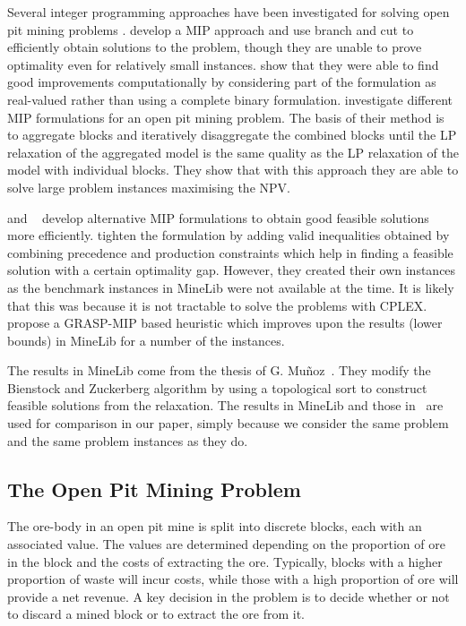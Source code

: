 \documentclass[authoryear,11pt,square,number,times,super,comma]{elsarticle}
\begin{document}
Several integer programming approaches have been investigated for solving open pit mining problems \citep{Caccetta2003, Ramazan:2004, BOLAND2009}. \citet{Caccetta2003} develop a MIP approach and use branch and cut to efficiently obtain solutions to the problem, though they are unable to prove optimality even for relatively small instances. \citet{Ramazan:2004} show that they were able to find good improvements computationally by considering part of the formulation as real-valued rather than using a complete binary formulation. \citet{BOLAND2009} investigate different MIP formulations for an open pit mining problem. The basis of their method is to aggregate blocks and iteratively disaggregate the combined blocks until the LP relaxation of the aggregated model is the same quality as the LP relaxation of the model with individual blocks. They show that with this approach they are able to solve large problem instances maximising the NPV.   


\cite{Bley:2010} and ~\cite{Kenny:2017} develop alternative MIP formulations to obtain good feasible solutions more efficiently. 
\cite{Bley:2010} tighten the formulation by adding valid inequalities obtained by combining precedence and production constraints  
which help in finding a feasible solution with a certain optimality gap. 
However, they created their own instances as the benchmark instances in MineLib were not available at the time. It is likely that this was because it is not tractable to solve the problems with CPLEX. 
\cite{Kenny:2017} propose a GRASP-MIP based heuristic which improves upon the results (lower bounds) in MineLib for a number of the instances.

The results in MineLib come from the thesis of G. Mu\~noz~\citep{munoz2012}. They modify the Bienstock and Zuckerberg algorithm by using a 
topological sort to construct feasible solutions from the relaxation. The results in MineLib and those in~\citet{Kenny:2017} are used for comparison in 
our paper, simply because we consider the same problem and the same problem instances as they do.

\subsection{The Open Pit Mining Problem} \label{sec:prob}
The ore-body in an open pit mine is split into discrete blocks, each with an associated value. The values are determined depending on the proportion of ore in the block and the costs of extracting the ore. Typically, blocks with a higher proportion of waste will incur costs, while those with a high proportion of ore will provide a net revenue. A key decision in the problem is to decide whether or not to discard a mined block or to extract the ore from it.
\end{document}

